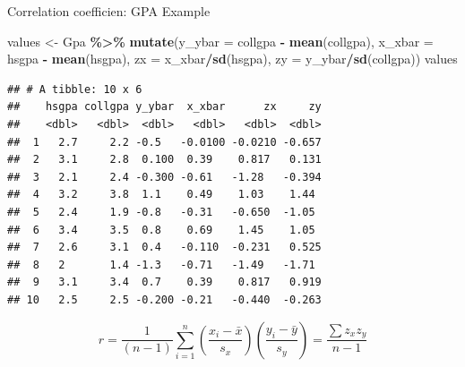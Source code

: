 \documentclass[
  ignorenonframetext,
]{beamer}
\newenvironment{Shaded}{\begin{snugshade}}{\end{snugshade}}
\newcommand{\AttributeTok}[1]{\textcolor[rgb]{0.13,0.29,0.53}{#1}}
\newcommand{\FunctionTok}[1]{\textcolor[rgb]{0.13,0.29,0.53}{\textbf{#1}}}
\newcommand{\NormalTok}[1]{#1}
\newcommand{\OtherTok}[1]{\textcolor[rgb]{0.56,0.35,0.01}{#1}}
\newcommand{\SpecialCharTok}[1]{\textcolor[rgb]{0.81,0.36,0.00}{\textbf{#1}}}
\begin{document}
\begin{frame}[fragile]{Correlation coefficien: GPA Example}
\protect\hypertarget{correlation-coefficien-gpa-example-2}{}
\tiny

\begin{Shaded}
\begin{Highlighting}[]
\NormalTok{values }\OtherTok{\textless{}{-}}\NormalTok{ Gpa }\SpecialCharTok{\%\textgreater{}\%} 
  \FunctionTok{mutate}\NormalTok{(}\AttributeTok{y\_ybar =}\NormalTok{ collgpa }\SpecialCharTok{{-}} \FunctionTok{mean}\NormalTok{(collgpa), }\AttributeTok{x\_xbar =}\NormalTok{ hsgpa }\SpecialCharTok{{-}} \FunctionTok{mean}\NormalTok{(hsgpa),}
         \AttributeTok{zx =}\NormalTok{ x\_xbar}\SpecialCharTok{/}\FunctionTok{sd}\NormalTok{(hsgpa), }\AttributeTok{zy =}\NormalTok{ y\_ybar}\SpecialCharTok{/}\FunctionTok{sd}\NormalTok{(collgpa))}
\NormalTok{values}
\end{Highlighting}
\end{Shaded}

\begin{verbatim}
## # A tibble: 10 x 6
##    hsgpa collgpa y_ybar  x_xbar      zx     zy
##    <dbl>   <dbl>  <dbl>   <dbl>   <dbl>  <dbl>
##  1   2.7     2.2 -0.5   -0.0100 -0.0210 -0.657
##  2   3.1     2.8  0.100  0.39    0.817   0.131
##  3   2.1     2.4 -0.300 -0.61   -1.28   -0.394
##  4   3.2     3.8  1.1    0.49    1.03    1.44 
##  5   2.4     1.9 -0.8   -0.31   -0.650  -1.05 
##  6   3.4     3.5  0.8    0.69    1.45    1.05 
##  7   2.6     3.1  0.4   -0.110  -0.231   0.525
##  8   2       1.4 -1.3   -0.71   -1.49   -1.71 
##  9   3.1     3.4  0.7    0.39    0.817   0.919
## 10   2.5     2.5 -0.200 -0.21   -0.440  -0.263
\end{verbatim}

\normalsize

\[r=\frac{1}{(n-1)}\sum_{i=1}^n \left(\frac{x_i-\bar{x}}{s_x}\right)\left(\frac{y_i-\bar{y}}{s_y}\right)=\frac{\sum z_x z_y}{n-1}\]
\end{frame}
\end{document}
